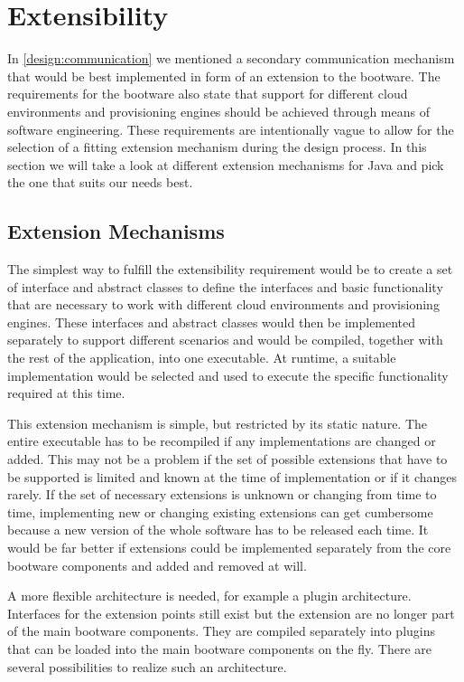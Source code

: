 \section{Extensibility}
\label{design:extensibility}

In \autoref{design:communication} we mentioned a secondary communication mechanism that would be best implemented in form of an extension to the bootware.
The requirements for the bootware also state that support for different cloud environments and provisioning engines should be achieved through means of software engineering.
These requirements are intentionally vague to allow for the selection of a fitting extension mechanism during the design process.
In this section we will take a look at different extension mechanisms for Java and pick the one that suits our needs best.

\subsection{Extension Mechanisms}

The simplest way to fulfill the extensibility requirement would be to create a set of interface and abstract classes to define the interfaces and basic functionality that are necessary to work with different cloud environments and provisioning engines.
These interfaces and abstract classes would then be implemented separately to support different scenarios and would be compiled, together with the rest of the application, into one executable.
At runtime, a suitable implementation would be selected and used to execute the specific functionality required at this time.

This extension mechanism is simple, but restricted by its static nature.
The entire executable has to be recompiled if any implementations are changed or added.
This may not be a problem if the set of possible extensions that have to be supported is limited and known at the time of implementation or if it changes rarely.
If the set of necessary extensions is unknown or changing from time to time, implementing new or changing existing extensions can get cumbersome because a new version of the whole software has to be released each time.
It would be far better if extensions could be implemented separately from the core bootware components and added and removed at will.

A more flexible architecture is needed, for example a plugin architecture.
Interfaces for the extension points still exist but the extension are no longer part of the main bootware components.
They are compiled separately into plugins that can be loaded into the main bootware components on the fly.
There are several possibilities to realize such an architecture.

